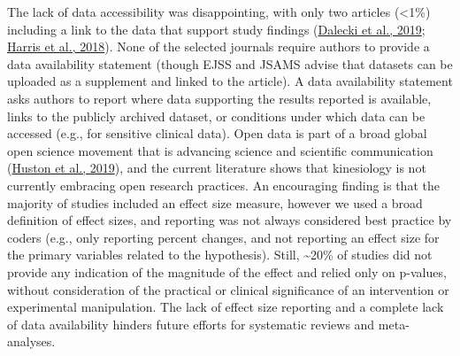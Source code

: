 \documentclass[]{cik}%
\begin{document}
The lack of data accessibility was disappointing, with only two articles
(\textless1\%) including a link to the data that support study findings
(\protect\hyperlink{ref-Dalecki2019}{Dalecki et al., 2019};
\protect\hyperlink{ref-Harris2018}{Harris et al., 2018}). None of the
selected journals require authors to provide a data availability
statement (though EJSS and JSAMS advise that datasets can be uploaded as
a supplement and linked to the article). A data availability statement
asks authors to report where data supporting the results reported is
available, links to the publicly archived dataset, or conditions under
which data can be accessed (e.g., for sensitive clinical data). Open
data is part of a broad global open science movement that is advancing
science and scientific communication
(\protect\hyperlink{ref-Huston2019}{Huston et al., 2019}), and the
current literature shows that kinesiology is not currently embracing
open research practices. An encouraging finding is that the majority of
studies included an effect size measure, however we used a broad
definition of effect sizes, and reporting was not always considered best
practice by coders (e.g., only reporting percent changes, and not
reporting an effect size for the primary variables related to the
hypothesis). Still, \textasciitilde20\% of studies did not provide any
indication of the magnitude of the effect and relied only on p-values,
without consideration of the practical or clinical significance of an
intervention or experimental manipulation. The lack of effect size
reporting and a complete lack of data availability hinders future
efforts for systematic reviews and meta-analyses.
\end{document}
